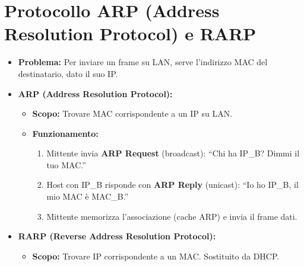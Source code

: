 \documentclass{article}
\begin{document}
\section{Protocollo ARP (Address Resolution Protocol) e RARP}
\begin{itemize}
    \item \textbf{Problema:} Per inviare un frame su LAN, serve l'indirizzo MAC del destinatario, dato il suo IP.
    \item \textbf{ARP (Address Resolution Protocol):}
    \begin{itemize}
        \item \textbf{Scopo:} Trovare MAC corrispondente a un IP su LAN.
        \item \textbf{Funzionamento:}
        \begin{enumerate}
            \item Mittente invia \textbf{ARP Request} (broadcast): ``Chi ha IP\_B? Dimmi il tuo MAC.''
            \item Host con IP\_B risponde con \textbf{ARP Reply} (unicast): ``Io ho IP\_B, il mio MAC è MAC\_B.''
            \item Mittente memorizza l'associazione (cache ARP) e invia il frame dati.
        \end{enumerate}
    \end{itemize}
    \item \textbf{RARP (Reverse Address Resolution Protocol):}
    \begin{itemize}
        \item \textbf{Scopo:} Trovare IP corrispondente a un MAC. Sostituito da DHCP.
    \end{itemize}
\end{itemize}
\end{document}
